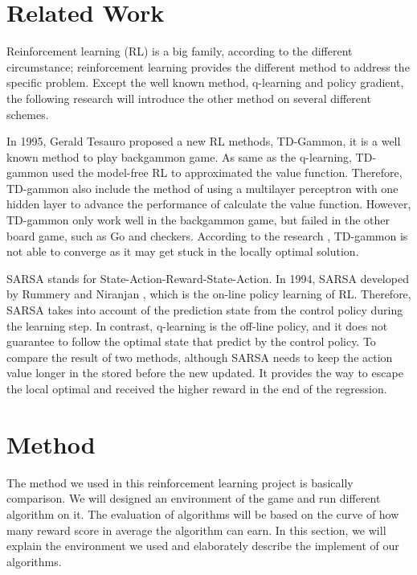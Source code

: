 \documentclass[article]{aaltoseries}
\begin{document}


\section{Related Work}

Reinforcement learning (RL) is a big family, according to the different circumstance; reinforcement learning provides the different method to address the specific problem. Except the well known method, q-learning and policy gradient, the following research will introduce the other method on several different schemes.

In 1995, Gerald Tesauro \cite{Tesauro:1995:TDL:203330.203343} proposed a new RL methods, TD-Gammon, it is a well known method to play backgammon game. As same as the q-learning, TD-gammon used the model-free RL to approximated the value function. Therefore, TD-gammon also include the method of using a multilayer perceptron with one hidden layer to advance the performance of calculate the value function. However, TD-gammon only work well in the backgammon game, but failed in the other board game, such as Go and checkers. According to the research \cite{Tesauro1992}, TD-gammon is not able to converge as it may get stuck in the locally optimal solution.
 
SARSA stands for State-Action-Reward-State-Action. In 1994, SARSA developed by Rummery and Niranjan \cite{articleonline}, which is the on-line policy learning of RL. Therefore, SARSA takes into account of the prediction state from the control policy during the learning step. In contrast, q-learning is the off-line policy, and it does not guarantee to follow the optimal state that predict by the control policy. To compare the result of two methods, although SARSA needs to keep the action value longer in the stored before the new updated. It provides the way to escape the local optimal and received the higher reward in the end of the regression.





\section{Method}


The method we used in this reinforcement learning project is basically comparison. We will designed an environment of the game and run different algorithm on it. The evaluation of algorithms will be based on the curve of how many reward score in average the algorithm can earn. In this section, we will explain the environment we used and elaborately describe the implement of our algorithms. 
\end{document}

